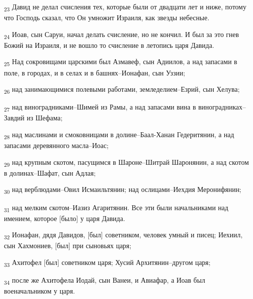 \begin{tcolorbox}
\textsubscript{23} Давид не делал счисления тех, которые были от двадцати лет и ниже, потому что Господь сказал, что Он умножит Израиля, как звезды небесные.
\end{tcolorbox}
\begin{tcolorbox}
\textsubscript{24} Иоав, сын Саруи, начал делать счисление, но не кончил. И был за это гнев Божий на Израиля, и не вошло то счисление в летопись царя Давида.
\end{tcolorbox}
\begin{tcolorbox}
\textsubscript{25} Над сокровищами царскими был Азмавеф, сын Адиилов, а над запасами в поле, в городах, и в селах и в башнях--Ионафан, сын Уззии;
\end{tcolorbox}
\begin{tcolorbox}
\textsubscript{26} над занимающимися полевыми работами, земледелием--Езрий, сын Хелува;
\end{tcolorbox}
\begin{tcolorbox}
\textsubscript{27} над виноградниками--Шимей из Рамы, а над запасами вина в виноградниках--Завдий из Шефама;
\end{tcolorbox}
\begin{tcolorbox}
\textsubscript{28} над маслинами и смоковницами в долине--Баал-Ханан Гедеритянин, а над запасами деревянного масла--Иоас;
\end{tcolorbox}
\begin{tcolorbox}
\textsubscript{29} над крупным скотом, пасущимся в Шароне--Шитрай Шаронянин, а над скотом в долинах--Шафат, сын Адлая;
\end{tcolorbox}
\begin{tcolorbox}
\textsubscript{30} над верблюдами--Овил Исмаильтянин; над ослицами--Иехдия Меронифянин;
\end{tcolorbox}
\begin{tcolorbox}
\textsubscript{31} над мелким скотом--Иазиз Агаритянин. Все эти были начальниками над имением, которое [было] у царя Давида.
\end{tcolorbox}
\begin{tcolorbox}
\textsubscript{32} Ионафан, дядя Давидов, [был] советником, человек умный и писец; Иехиил, сын Хахмониев, [был] при сыновьях царя;
\end{tcolorbox}
\begin{tcolorbox}
\textsubscript{33} Ахитофел [был] советником царя; Хусий Архитянин--другом царя;
\end{tcolorbox}
\begin{tcolorbox}
\textsubscript{34} после же Ахитофела Иодай, сын Ванеи, и Авиафар, а Иоав был военачальником у царя.
\end{tcolorbox}
